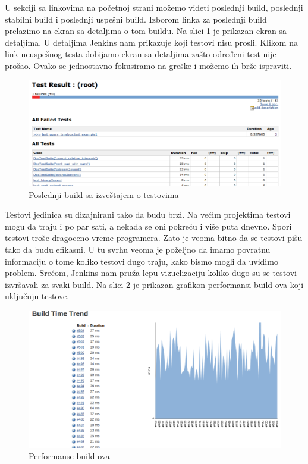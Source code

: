 U sekciji sa linkovima na početnoj strani možemo videti poslednji build, poslednji stabilni build i poslednji uspešni build. Izborom linka za poslednji build prelazimo na ekran sa detaljima o tom buildu. Na slici \ref{fig:test_last_build} je prikazan ekran sa detaljima. U detaljima Jenkins nam prikazuje koji testovi nisu prosli. Klikom na link neuspešnog testa dobijamo ekran sa detaljima zašto određeni test nije prošao. Ovako se jednostavno fokusiramo na greške i možemo ih brže ispraviti.

\begin{figure}
\begin{center}
\includegraphics[scale=0.35]{slike/test_last_build.png}
\end{center}
\caption{Poslednji build sa izveštajem o testovima}
\label{fig:test_last_build}
\end{figure}

Testovi jedinica su dizajnirani tako da budu brzi. Na većim projektima testovi mogu da traju i po par sati, a nekada se oni pokreću i više puta dnevno. Spori testovi troše dragoceno vreme programera. Zato je veoma bitno da se testovi pišu tako da budu efikasni. U tu svrhu veoma je poželjno da imamo povratnu informaciju o tome koliko testovi dugo traju, kako bismo mogli da uvidimo problem. Srećom, Jenkins nam pruža lepu vizuelizaciju koliko dugo su se testovi izvršavali za svaki build. Na slici \ref{fig:buildtimetrend} je prikazan grafikon performansi build-ova koji uključuju testove.

\begin{figure}
\begin{center}
\includegraphics[scale=0.35]{slike/buildtimetrend.png}
\end{center}
\caption{Performanse build-ova}
\label{fig:buildtimetrend}
\end{figure}

